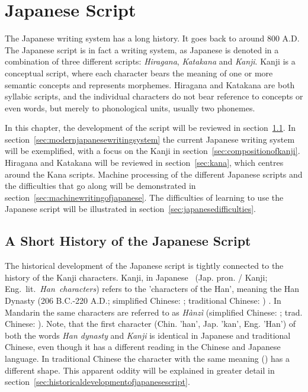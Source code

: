 
\chapter{Japanese Script}
\label{sec:japansescript}

The Japanese writing system has a long history. It goes back to around 800 A.D. 
The Japanese script is in fact a writing system, as Japanese is denoted in 
a combination of three different scripts: \emph{Hiragana}, \emph{Katakana} and 
\emph{Kanji}. Kanji is a conceptual script, where each character bears the 
meaning of one or more semantic concepts and represents morphemes. 
Hiragana and Katakana are both syllabic scripts, and the individual characters do
not bear reference to concepts or even words, but merely to phonological units, 
usually two phonemes.

In this chapter, the development of the script will be reviewed in 
section~\ref{sec:ashorthistoryofjapanesewritingsystem}.
In section~\ref{sec:modernjapanesewritingsystem} the current Japanese writing 
system will be exemplified, with a focus on the Kanji in 
section~\ref{sec:compositionofkanji}. Hiragana and Katakana will be reviewed in
section~\ref{sec:kana}, which centres around the Kana scripts. 
Machine processing of the different Japanese scripts and the difficulties that
go along will be demonstrated in section~\ref{sec:machinewritingofjapanese}.
The difficulties of learning to use the Japanese script will be illustrated in 
section~\ref{sec:japanesedifficulties}.

\section{A Short History of the Japanese Script}
\label{sec:ashorthistoryofjapanesewritingsystem}

The historical development of the Japanese script is tightly connected to the 
history of the Kanji characters. Kanji, in Japanese 
~(Jap. pron.  / Kanji; Eng.~lit.~\emph{Han~characters}) 
refers to the 'characters of the Han', meaning the Han Dynasty 
(206 B.C.-220 A.D.; simplified Chinese: ; traditional Chinese: 
) . In Mandarin the same characters are 
referred to as \emph{Hànzì} (simplified Chinese: ; 
trad. Chinese: ).
Note, that the first character  (Chin. 'han', Jap. 'kan', Eng. 'Han') 
of both the words \emph{Han dynasty} and \emph{Kanji} is identical in Japanese 
and traditional Chinese, even though it has a different reading in the 
Chinese and Japanese language. In traditional Chinese the character with
the same meaning () has a different shape. This apparent oddity will be 
explained in greater detail in 
section~\ref{sec:historicaldevelopmentofjapanesescript}.


